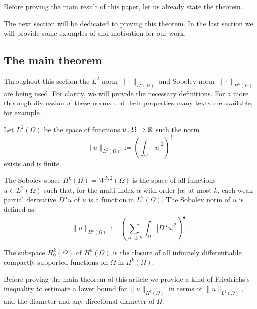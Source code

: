 Before proving the main result of this paper, let us already state the theorem.


The next section will be dedicated to proving this theorem. In the last section we will provide some examples of and motivation for our work.


\subsection{The main theorem} \label{sec:main_theorem}

Throughout this section the $L^2$-norm $\|\cdot\|_{L^2(\Omega)}$ and Sobolev norm $\|\cdot\|_{H^k(\Omega)}$ are being used. For clarity, we will provide the necessary definitions. For a more thorough discussion of these norms and their properties many texts are available, for example \cite{adams_sobolev_2003}.

Let $L^2(\Omega)$ be the space of functions $u : \Omega \to \mathbb{R}$ such the norm
$$
  \|u\|_{L^2(\Omega)} := \left(\int_\Omega \left| u \right|^2 \right)^{\frac{1}{2}}
$$
exists and is finite.

The Sobolev space $ H^k(\Omega) = W^{k, 2}(\Omega) $ is the space of all functions $u \in L^2(\Omega)$ such that, for the multi-index $\alpha$ with order $|\alpha|$ at most $k$, each weak partial derivative $D^\alpha u$ of $u$ is a function in $L^2(\Omega)$. The Sobolev norm of $u$ is defined as:
$$
  \|u\|_{H^k(\Omega)} := \left(\sum_{|\alpha| \leq k} \int_\Omega \left| D^\alpha u \right|^2\right)^{\frac{1}{2}}\text{.}
$$

The subspace $ H^k_0(\Omega)$ of $H^k(\Omega)$ is the closure of all infinitely differentiable compactly supported functions on $\Omega$ in $H^k(\Omega)$.

Before proving the main theorem of this article we provide a kind of Fried\-richs's inequality to estimate a lower bound for $\| u \|_{H^k(\Omega)}$ in terms of $\| u \|_{L^2(\Omega)}$, and the diameter and any directional diameter of $\Omega$.

